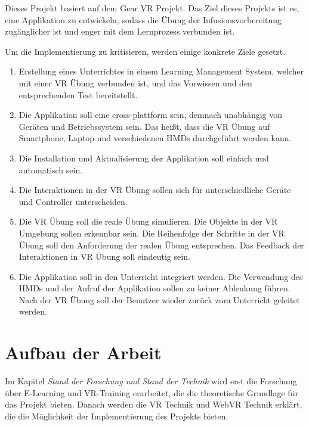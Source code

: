 Dieses Projekt basiert auf dem Gear VR Projekt. Das Ziel dieses Projekts ist es, eine Applikation zu entwickeln, sodass die Übung der Infusionsvorbereitung zugänglicher ist und enger mit dem Lernprozess verbunden ist.

Um die Implementierung zu kritisieren, werden einige konkrete Ziele gesetzt.

\begin{enumerate}[labelsep=1ex]
	\renewcommand{\labelenumi}{\textbf{Z\theenumi.}}
	\item Erstellung eines Unterrichtes in einem Learning Management System, welcher mit einer VR Übung verbunden ist, und das Vorwissen und den entsprechenden Test bereitstellt.
	
	\item Die Applikation soll eine cross-plattform sein, demnach unabhängig von Geräten und Betriebssystem sein. Das heißt, dass die VR Übung auf Smartphone, Laptop und verschiedenen HMDs durchgeführt werden kann.
	
	\item Die Installation und Aktualisierung der Applikation soll einfach und automatisch sein.
	
	\item Die Interaktionen in der VR Übung sollen sich für unterschiedliche Geräte und Controller unterscheiden.
	
	\item Die VR Übung soll die reale Übung simulieren. Die Objekte in der VR Umgebung sollen erkennbar sein. Die Reihenfolge der Schritte in der VR Übung soll den Anforderung der realen Übung entsprechen. Das Feedback der Interaktionen in VR Übung soll eindeutig sein.
	
	\item Die Applikation soll in den Unterricht integriert werden. Die Verwendung des HMDs und der Aufruf der Applikation sollen zu keiner Ablenkung führen. Nach der VR Übung soll der Benutzer wieder zurück zum Unterricht geleitet werden.
	
\end{enumerate}

\section{Aufbau der Arbeit}
Im Kapitel {\em Stand der Forschung und Stand der Technik} wird erst die Forschung über E-Learning und VR-Training erarbeitet, die die theoretische Grundlage für das Projekt bieten. Danach werden die VR Technik und WebVR Technik erklärt, die die Möglichkeit der Implementierung des Projekts bieten.

